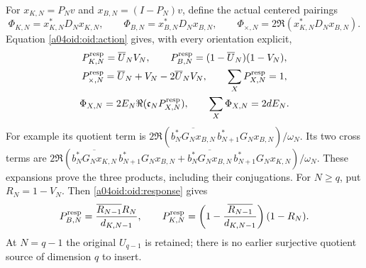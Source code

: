 For $x_{K,N}=P_Nv$ and $x_{B,N}=(I-P_N)v$, define the actual
centered pairings
\[
 \Phi_{K,N}=x_{K,N}^*D_Nx_{K,N},\qquad
 \Phi_{B,N}=x_{B,N}^*D_Nx_{B,N},\qquad
 \Phi_{\times,N}=2\Re(x_{K,N}^*D_Nx_{B,N}).
\]
Equation \eqref{a04oid:oid:action} gives, with every orientation explicit,
\begin{equation}\label{a04oid:oid:products}
\begin{gathered}
 P_{K,N}^{\rm resp}=\overline U_NV_N,\qquad
 P_{B,N}^{\rm resp}=(1-\overline U_N)(1-V_N),\\
 P_{\times,N}^{\rm resp}=\overline U_N+V_N-2\overline U_NV_N,
 \qquad \sum_XP_{X,N}^{\rm resp}=1,\\
 \Phi_{X,N}=2E_N\Re(\mathfrak c_NP_{X,N}^{\rm resp}),\qquad
 \sum_X\Phi_{X,N}=2dE_N.
\end{gathered}
\end{equation}
For example its quotient term is
$2\Re(\overline{b_N^*G_Nx_{B,N}}\,
b_{N+1}^*G_Nx_{B,N})/\omega_N$. Its two cross terms are
$2\Re(\overline{b_N^*G_Nx_{K,N}}\,b_{N+1}^*G_Nx_{B,N}
+\overline{b_N^*G_Nx_{B,N}}\,b_{N+1}^*G_Nx_{K,N})/\omega_N$.
These expansions prove the three products, including their conjugations.
For $N\ge q$, put $R_N=1-V_N$. Then \eqref{a04oid:oid:response} gives
\begin{equation}\label{a04oid:oid:consecutiveproducts}
 P_{B,N}^{\rm resp}
 =\frac{\overline{R_{N-1}}R_N}{d_{K,N-1}},\qquad
 P_{K,N}^{\rm resp}
 =\left(1-\frac{\overline{R_{N-1}}}{d_{K,N-1}}\right)(1-R_N).
\end{equation}
At $N=q-1$ the original $U_{q-1}$ is retained; there is no earlier
surjective quotient source of dimension $q$ to insert.

